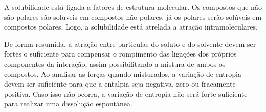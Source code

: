 A solubilidade está ligada a fatores de estrutura molecular. Os compostos que não são polares são soluveis em compostos não polares, já os polares serão solúveis em compostos polares. Logo, a solubilidade está atrelada a atração intramoleculares.

De forma resumida, a atração entre particulas do soluto e do solvente devem ser fortes o suficiente para compensar o rompimento das ligações dos próprios componentes da interação, assim possibilitando a mistura de ambos os compostos. Ao analisar as forças quando misturados, a variação de entropia devem ser suficiente para que a entalpia seja negativa, zero ou fracamente positiva. Caso isso não ocorra, a variação de entropia não será forte suficiente para realizar uma dissolução espontânea.
